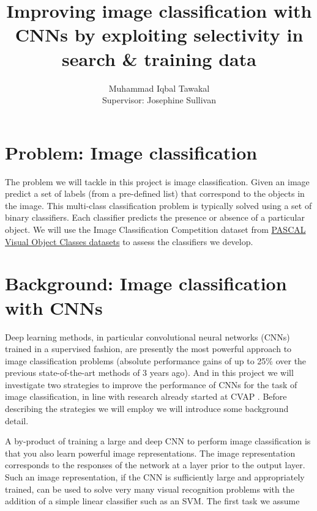 \documentclass[a4paper]{article}
\title{Improving image classification with CNNs by exploiting
  selectivity in search \& training data}
\author{Muhammad Iqbal Tawakal\\
 Supervisor: Josephine Sullivan}
\date{}
\begin{document}
\maketitle

\section{Problem: Image classification}

The problem we will tackle in this project is image
classification. Given an image predict a set of labels (from a
pre-defined list) that correspond to the objects in the image. This
multi-class classification problem is typically solved using a set of
binary classifiers. Each classifier predicts the presence or absence
of a particular object. We will use the Image Classification
Competition dataset from
\href{http://pascallin.ecs.soton.ac.uk/challenges/VOC/}{PASCAL Visual
  Object Classes datasets} to assess the classifiers we develop.

\section{Background: Image classification with CNNs}

Deep learning methods, in particular convolutional neural networks
(CNNs)\cite{LeCun:ieee:98} trained in a supervised fashion, are
presently the most powerful approach to image classification problems
\cite{Krizhevsky:nips:12} (absolute performance gains of up to 25\%
over the previous state-of-the-art methods of 3 years ago). And in
this project we will investigate two strategies to improve the
performance of CNNs for the task of image classification, in line with
research already started at CVAP
\cite{Razavian:arxiv:14,Hossein:arxiv:14}. Before describing the
strategies we will employ we will introduce some background detail.


A by-product of training a large and deep CNN to perform image
classification is that you also learn powerful image
representations. The image representation corresponds to the responses
of the network at a layer prior to the output layer. Such an image
representation, if the CNN is sufficiently large and appropriately
trained, can be used to solve very many visual recognition problems
\cite{Razavian:arxiv:14} with the addition of a simple linear
classifier such as an SVM. The first task we assume 
\end{document}
